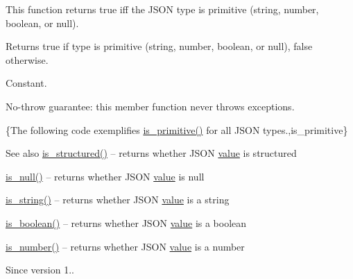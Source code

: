 This function returns true iff the J\+S\+ON type is primitive (string, number, boolean, or null).

\begin{DoxyReturn}{Returns}
{\ttfamily true} if type is primitive (string, number, boolean, or null), {\ttfamily false} otherwise.
\end{DoxyReturn}
Constant.

No-\/throw guarantee\+: this member function never throws exceptions.

\{The following code exemplifies {\ttfamily \hyperlink{classnlohmann_1_1basic__json_adcd6086bac286854d5cc8b7f84d74a49}{is\+\_\+primitive()}} for all J\+S\+ON types.,is\+\_\+primitive\}

\begin{DoxySeeAlso}{See also}
\hyperlink{classnlohmann_1_1basic__json_a873f4bff2f2a83f68fc1b5341ebdd446}{is\+\_\+structured()} -- returns whether J\+S\+ON \hyperlink{classnlohmann_1_1basic__json_a407e73a037e6e3067ef7aa2c25a79f39}{value} is structured 

\hyperlink{classnlohmann_1_1basic__json_a8abdfc0d6e051f6fa29d49da57bce631}{is\+\_\+null()} -- returns whether J\+S\+ON \hyperlink{classnlohmann_1_1basic__json_a407e73a037e6e3067ef7aa2c25a79f39}{value} is {\ttfamily null} 

\hyperlink{classnlohmann_1_1basic__json_a409e854d754f5684b2cce74ee20dbc3b}{is\+\_\+string()} -- returns whether J\+S\+ON \hyperlink{classnlohmann_1_1basic__json_a407e73a037e6e3067ef7aa2c25a79f39}{value} is a string 

\hyperlink{classnlohmann_1_1basic__json_adade77415e7f7bf08a9b5150c742714d}{is\+\_\+boolean()} -- returns whether J\+S\+ON \hyperlink{classnlohmann_1_1basic__json_a407e73a037e6e3067ef7aa2c25a79f39}{value} is a boolean 

\hyperlink{classnlohmann_1_1basic__json_a957eb9594c7f0ca93212c30f3a400873}{is\+\_\+number()} -- returns whether J\+S\+ON \hyperlink{classnlohmann_1_1basic__json_a407e73a037e6e3067ef7aa2c25a79f39}{value} is a number
\end{DoxySeeAlso}
\begin{DoxySince}{Since}
version 1.. 
\end{DoxySince}
\hypertarget{classnlohmann_1_1basic__json_a409e854d754f5684b2cce74ee20dbc3b}{}\label{classnlohmann_1_1basic__json_a409e854d754f5684b2cce74ee20dbc3b} 
